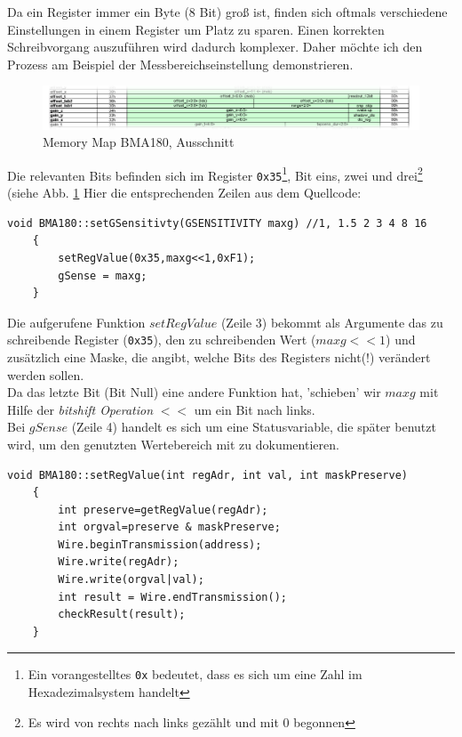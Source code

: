 \documentclass[12pt,a4paper]{scrartcl}
\begin{document}
Da ein Register immer ein Byte (8 Bit) groß ist, finden sich oftmals verschiedene Einstellungen in einem Register um Platz zu sparen. Einen korrekten Schreibvorgang auszuführen wird dadurch komplexer. Daher möchte ich den Prozess am Beispiel der Messbereichseinstellung demonstrieren.

\begin{figure}[H]
\includegraphics[scale=.359]{registerstransp}
\caption{Memory Map BMA180, Ausschnitt \citep{Sensortec:2009rt}}
\label{registermap}
\end{figure}

Die relevanten Bits befinden sich im Register \texttt{0x35}\footnote{Ein vorangestelltes \texttt{0x} bedeutet, dass es sich um eine Zahl im Hexadezimalsystem handelt}, Bit eins, zwei und drei\footnote{Es wird von rechts nach links gezählt und mit 0 begonnen} (siehe Abb. \ref{registermap} Hier die entsprechenden Zeilen aus dem Quellcode:

\lstset{frameround=fttt}
\begin{lstlisting}[frame=trBL]
	void BMA180::setGSensitivty(GSENSITIVITY maxg) //1, 1.5 2 3 4 8 16
	{
	    setRegValue(0x35,maxg<<1,0xF1);
	    gSense = maxg;
	}
\end{lstlisting}
 
Die aufgerufene Funktion $setRegValue$ (Zeile 3) bekommt als Argumente das zu schreibende Register (\texttt{0x35}), den zu schreibenden Wert ($maxg << 1$) und zusätzlich eine Maske, die angibt, welche Bits des Registers nicht(!) verändert werden sollen.\\
Da das letzte Bit (Bit Null) eine andere Funktion hat, 'schieben' wir $maxg$ mit Hilfe der \textit{bitshift Operation} $<<$ um ein Bit nach links.\\
Bei $gSense$ (Zeile 4) handelt es sich um eine Statusvariable, die später benutzt wird, um den genutzten Wertebereich mit zu dokumentieren.\\


\begin{lstlisting}[frame=trBL]
	void BMA180::setRegValue(int regAdr, int val, int maskPreserve)
	{
	    int preserve=getRegValue(regAdr);	
	    int orgval=preserve & maskPreserve;
	    Wire.beginTransmission(address);
	    Wire.write(regAdr);
	    Wire.write(orgval|val);
	    int result = Wire.endTransmission();
	    checkResult(result);
	}
\end{lstlisting}
\end{document}
